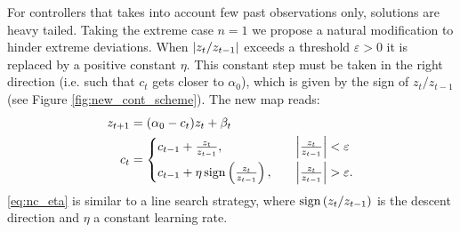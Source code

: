 \documentclass[FinalReport.tex]{subfiles}
\begin{document}
For controllers that takes into account few past observations only, solutions are heavy tailed. Taking the extreme case $n=1$ we propose a natural modification to hinder extreme deviations. When $\abs{z_t/z_{t-1}}$ exceeds a threshold $\varepsilon>0$ it is replaced by a positive constant $\eta$. This constant step must be taken in the right direction (i.e. such that $c_t$ gets closer to $\alpha_0$), which is given by the sign of $z_t/z_{t-1}$ (see Figure \ref{fig:new_cont_scheme}). The new map reads:
\begin{subequations}
\begin{align}	
	z_{t+1}&=(\alpha_0-c_t)z_t+\beta_t\\
	c_t&=
\begin{cases}\label{eq:nc_eta}
	c_{t-1}+\frac{z_t}{z_{t-1}},\quad &\abs{\frac{z_t}{z_{t-1}} }<\varepsilon\vspace{.1cm} \\ 
	c_{t-1}+\eta\,\sign{\frac{z_t}{z_{t-1}}},\quad &\abs{\frac{z_t}{z_{t-1}} }>\varepsilon .
\end{cases}
\end{align}
\label{eq:nc}
\end{subequations}
\eqref{eq:nc_eta} is similar to a line search strategy, where $\text{sign}\left(z_t/z_{t-1}\right)$ is the descent direction and $\eta$ a constant learning rate.
\end{document}
